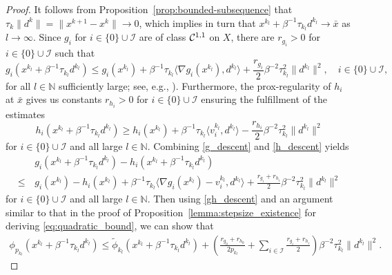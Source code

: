 \documentclass[11pt,a4paper]{article}
\theoremstyle{plain}
\begin{document}
\begin{proof}
It follows from Proposition~\ref{prop:bounded-subsequence} that $\tau_k \|d^k\| = \|x^{k+1} - x^k\| \to 0$, which implies in turn that $x^{k_l} + \beta^{-1}{\tau_{k_l}} d^{k_l} \rightarrow \bar{x}$ as $l \rightarrow \infty$. 
Since  \( g_i \) for \( i\in\{0\} \cup\mathcal{I}\) are of class ${\cal C}^{1,1}$ on \( X \), there are \( r_{g_i} > 0 \) for \( i\in\{0\} \cup\mathcal{I}\) such that
\begin{equation}
g_i\left(x^{k_l} + \beta^{-1} \tau_{k_l} d^{k_l}\right) \leq g_i(x^{k_l}) + \beta^{-1} \tau_{k_l} \langle \nabla g_i(x^{k_l}), d^{k_l} \rangle + \frac{r_{g_i}}{2} \beta^{-2} \tau_{k_l}^2 \|d^{k_l}\|^2, \quad i\in\{0\} \cup\mathcal{I},  \label{g_descent} 
\end{equation}
for all $l\in\mathbb N$ sufficiently large; see, e.g., \cite[Lemma A.11]{IzmailovSolodov2014}). Furthermore, the prox-regularity of \( h_i \) at $\bar{x}$ gives us constants \( r_{h_i} > 0 \) for \( i\in\{0\} \cup\mathcal{I}\) ensuring the fulfillment of the estimates
\begin{equation}
h_i\left(x^{k_l} + \beta^{-1} \tau_{k_l} d^{k_l}\right) \ge  h_i(x^{k_l}) + \beta^{-1} \tau_{k_l} \langle v_i^{k_l}, d^{k_l} \rangle - \frac{r_{h_i}}{2} \beta^{-2} \tau_{k_l}^2 \|d^{k_l}\|^2\label{h_descent} 
\end{equation}
for \( i\in\{0\} \cup\mathcal{I}\) and all large $l\in\mathbb N$. 
Combining \eqref{g_descent} and \eqref{h_descent} yields
\begin{equation}\label{gh_descent}
\begin{aligned}
&  g_i\left(x^{k_l} + \beta^{-1} \tau_{k_l} d^{k_l}\right) - h_i\left(x^{k_l} + \beta^{-1} \tau_{k_l} d^{k_l}\right)  \\ 
\leq \, &g_i\left(x^{k_l}\right) - h_i\left(x^{k_l}\right) + \beta^{-1} \tau_{k_l} \langle \nabla g_i(x^{k_l}) - v_i^{k_l}, d^{k_l} \rangle + \frac{r_{g_i} + r_{h_i}}{2} \beta^{-2} \tau_{k_l}^2 \|d^{k_l}\|^2 
\end{aligned}
\end{equation}
for \( i\in\{0\} \cup\mathcal{I}\) and all large $l\in\mathbb N$. 
Then using \eqref{gh_descent} and an argument similar to that in the proof of Proposition~\ref{lemma:stepsize_existence} for deriving
\eqref{eq:quadratic_bound}, we can show that
\begin{equation}\label{merit function decent}
\begin{aligned}
\phi_{p_{k_l}} \left(x^{k_l} + \beta^{-1} \tau_{k_l} d^{k_l}\right) \leq \tilde\phi_{k_l} \left(x^{k_l} + \beta^{-1} \tau_{k_l} d^{k_l}\right)+\left(\frac{r_{g_0} + r_{h_0}}{2p_{k_l}} + \sum_{i\in\mathcal I} \frac{r_{g_i} + r_{h_i}}{2}\right)\beta^{-2}\tau_{k_l}^2 \|d^{k_l}\|^2.

\end{aligned}
\end{equation}
\end{proof}
\end{document}
